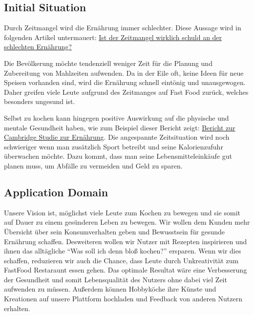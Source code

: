 \documentclass[12pt]{article}
\theoremstyle{definition}
\begin{document}
\subsection{Initial Situation}
Durch Zeitmangel wird die Ernährung immer schlechter. Diese Aussage wird in folgenden Artikel untermauert: \hyperlink{https://www.gesund.at/ernaehrung/gesunde-ernaehrung-zeit/}{\color{blue}Ist der Zeitmangel wirklich schuld an der schlechten Ernährung?}

Die Bevölkerung möchte tendenziell weniger Zeit für die Planung und Zubereitung von Mahlzeiten aufwenden. Da in der Eile oft, keine Ideen für neue Speisen vorhanden sind, wird die Ernährung schnell eintönig und unausgewogen. Daher greifen viele Leute aufgrund des Zeitmanges auf Fast Food zurück, welches besonders ungesund ist. 

Selbst zu kochen kann hingegen positive Auswirkung auf die physische und mentale Gesundheit haben, wie zum Beispiel dieser Bericht zeigt:
\hyperlink{https://www.huffpost.com/entry/cooking-longevity_n_1518466?guccounter=1&guce_referrer=aHR0cHM6Ly93d3cuZ29vZ2xlLmNvbS8&guce_referrer_sig=AQAAAD3kSnBoydOhZwbnnWL-ifUA6FwaQfkqdJv0bSVaUdyuhl4C6NVEeAAiluGbP9UVwuqUbucdfEpI52AC8rfEJkO3KkpP64ZMdVRKjGck46ZzFhcoiL22O4cm3ARE7xv_Iy1_wFgeMpTcOUYfxZ8hvpvg-gfYQlpe_FKIpiW4nF30}{\color{blue}Bericht zur Cambridge Studie zur Ernährung}.
 Die angespannte Zeitsituation wird noch schwieriger wenn man zusätzlich Sport betreibt und seine Kalorienzufuhr überwachen möchte. Dazu kommt, dass man seine Lebensmitteleinkäufe gut planen muss, um Abfälle zu vermeiden und Geld zu sparen.

\subsection{Application Domain}
Unsere Vision ist, möglichst viele Leute zum Kochen zu bewegen und sie somit auf Dauer zu einem gesünderen Leben zu bewegen. Wir wollen dem Kunden mehr Übersicht über sein Konsumverhalten geben und Bewusstsein für gesunde Ernährung schaffen. Desweiteren wollen wir Nutzer mit Rezepten inspirieren und ihnen das alltägliche ``Was soll ich denn bloß kochen?''        ersparen. Wenn wir dies schaffen, reduzieren wir auch die Chance, dass Leute durch Unkreativität zum FastFood Restaraunt essen gehen. Das optimale Resultat wäre eine Verbesserung der Gesundheit und somit Lebensqualität des Nutzers ohne dabei viel Zeit aufwenden zu müssen. Außerdem können Hobbyköche ihre Künste und Kreationen auf unsere Plattform hochladen und Feedback von anderen Nutzern erhalten. 
\end{document}
